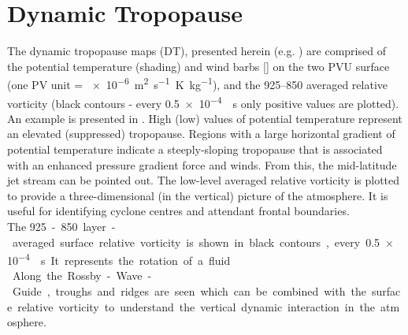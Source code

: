 \section{Dynamic Tropopause}
\label{sec:DT}
The dynamic tropopause maps (DT), presented herein (e.g. ) are comprised of the potential temperature (shading) and wind barbs [\SI{}{\mPs}] on the two PVU surface (one PV unit = \SI{e-6}{\metre\squared\per\s\kelvin\per\kg}), and the \num{925}--\SI{850}{\hPa} averaged relative vorticity (black contours - every \SI{.5e-4}{\per\second} only positive values are plotted).  An example is presented in .
High (low) values of potential temperature represent an elevated (suppressed) tropopause. Regions with a large horizontal gradient of potential temperature indicate a steeply-sloping tropopause that is associated with an enhanced pressure gradient force and winds. From this, the mid-latitude jet stream can be pointed out. The low-level averaged relative vorticity is plotted to provide a three-dimensional (in the vertical) picture of the atmosphere. It is useful for identifying cyclone centres and attendant frontal boundaries.
\\
The  \SI{925}-\SI{850}{\hPa} layer-averaged surface relative vorticity is shown in black contours, every \SI{.5e-4}{\per\second}. It represents the rotation of a fluid.
\\
Along the Rossby-Wave-Guide, troughs and ridges are seen which can be combined with the surface relative vorticity to understand the vertical dynamic interaction in the atmosphere. 
